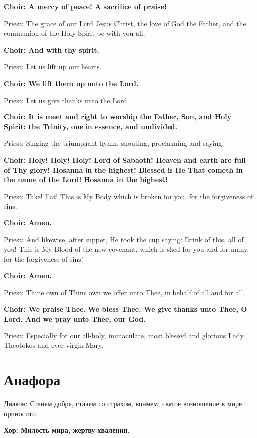 \documentclass[12pt,a4paper,titlepage]{report}
\begin{document}
\begin{paracol}[1]{2}
  \textbf{Choir: A mercy of peace! A sacrifice of praise!}

  Priest: The grace of our Lord Jesus Christ, the love of God the Father, and the communion of the Holy Spirit be with you all.

  \textbf{Choir: And with thy spirit.}

  Priest: Let us lift up our hearts.

  \textbf{Choir: We lift them up unto the Lord.}

  Priest: Let us give thanks unto the Lord.

  \textbf{Choir: It is meet and right to worship the Father, Son, and Holy Spirit: the Trinity, one in essence, and undivided.}

  Priest: Singing the triumphant hymn, shouting, proclaiming and saying:

  \textbf{Choir: Holy! Holy! Holy! Lord of Sabaoth! Heaven and earth are full of Thy glory! Hosanna in the highest! Blessed is He That cometh in the name of the Lord! Hosanna in the highest!}

  Priest: Take! Eat! This is My Body which is broken for you, for the forgiveness of sins.

  \textbf{Choir: Amen.}

  Priest: And likewise, after supper, He took the cup saying: Drink of this, all of you! This is My Blood of the new covenant, which is shed for you and for many, for the forgiveness of sins!

  \textbf{Choir: Amen.}

  Priest: Thine own of Thine own we offer unto Thee, in behalf of all and for all.

  \textbf{Choir: We praise Thee. We bless Thee. We give thanks unto Thee, O Lord. And we pray unto Thee, our God.}

  Priest: Especially for our all-holy, immaculate, most blessed and glorious Lady Theotokos and ever-virgin Mary.

  \switchcolumn[1]

  \section*{Анафора}

  Диакон: Станем добре, станем со страхом, вонмем, святое возношение в мире приносити.

  \textbf{Хор: Милость мира, жертву хваления.}


\end{paracol}
\end{document}
